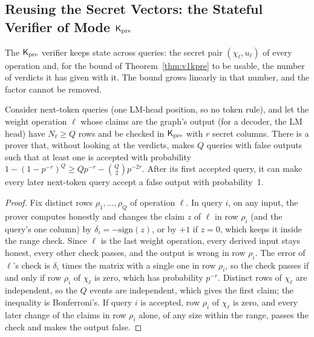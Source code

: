 \subsection{Reusing the Secret Vectors: the Stateful Verifier of Mode \texorpdfstring{$\mathsf{K}_{\mathrm{pre}}$}{Kpre}}
\label{app:stateful}

The $\mathsf{K}_{\mathrm{pre}}$ verifier keeps state across queries: the secret pair $(\chi_\ell,u_\ell)$ of every
operation and, for the bound of Theorem~\ref{thm:v1kpre} to be usable, the number of verdicts it has
given with it. The bound grows linearly in that number, and the factor cannot be removed.

\begin{proposition}
\label{prop:qtight}
Consider next-token queries (one LM-head position, so no token rule), and let the weight operation
$\ell$ whose claims are the graph's output (for a decoder, the LM head) have $N_\ell\ge Q$ rows and be
checked in $\mathsf{K}_{\mathrm{pre}}$ with $r$ secret columns. There is a prover that, without looking at the verdicts,
makes $Q$ queries with false outputs such that at least one is accepted with probability
$1-(1-p^{-r})^Q\ge Qp^{-r}-\binom Q2p^{-2r}$. After its first accepted query, it can make every later
next-token query accept a false output with probability~1.
\end{proposition}

\begin{proof}
Fix distinct rows $\rho_1,\dots,\rho_Q$ of operation $\ell$. In query $i$, on any input, the prover
computes honestly and changes the claim $z$ of $\ell$ in row $\rho_i$ (and the query's one column) by
$\delta_i=-\mathrm{sign}(z)$, or by $+1$ if $z=0$, which keeps it inside the range check. Since $\ell$
is the last weight operation, every derived input stays honest, every other check passes, and the
output is wrong in row $\rho_i$. The error of $\ell$'s check is $\delta_i$ times the matrix with a
single one in row $\rho_i$, so the check passes if and only if row $\rho_i$ of $\chi_\ell$ is zero,
which has probability $p^{-r}$. Distinct rows of $\chi_\ell$ are independent, so the $Q$ events are
independent, which gives the first claim; the inequality is Bonferroni's. If query $i$ is accepted,
row $\rho_i$ of $\chi_\ell$ is zero, and every later change of the claims in row $\rho_i$ alone, of
any size within the range, passes the check and makes the output false.
\end{proof}


